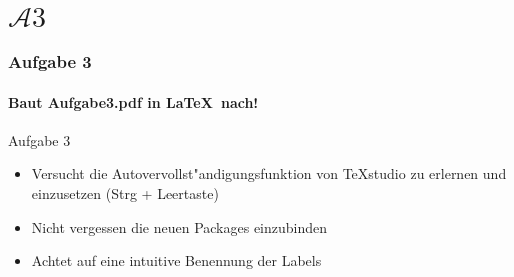 \section{$\mathcal{A}3$} 
\begin{frame}
\frametitle{Aufgabe 3}
\framesubtitle{Baut Aufgabe3.pdf in \LaTeX ~nach!} 

\begin{block}{Aufgabe 3}
\begin{itemize}
\item Versucht die Autovervollst"andigungsfunktion von \TeX studio zu erlernen und einzusetzen
{\footnotesize(Strg + Leertaste)}
\item Nicht vergessen die neuen Packages einzubinden 
\item Achtet auf eine intuitive Benennung der Labels
\end{itemize}
\end{block}
\end{frame}